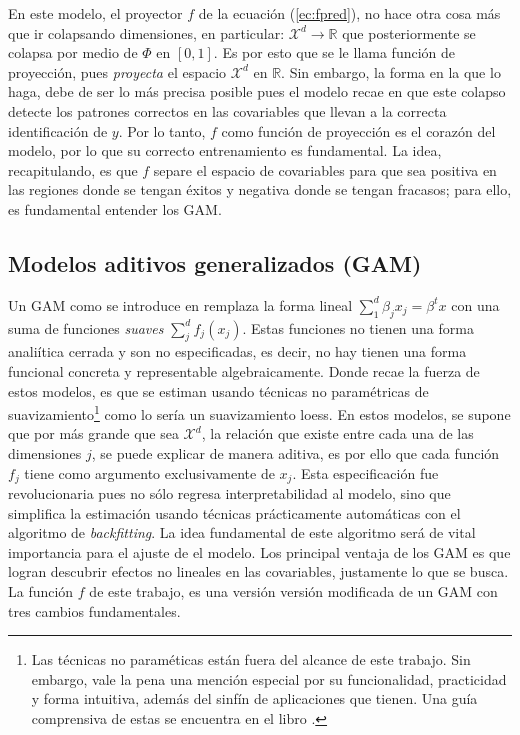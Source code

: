 \documentclass[../Main/Main.tex]{subfiles}
\begin{document}
En este modelo, el proyector $f$ de la ecuación (\ref{ec:fpred}), no hace otra cosa más que ir colapsando dimensiones, en particular: $\mathcal{X}^d \rightarrow \mathbb{R}$ que posteriormente se colapsa por medio de $\Phi$ en $[0,1]$. Es por esto que se le llama función de proyección, pues \textit{proyecta} el espacio $\mathcal{X}^d$ en $\mathbb{R}$. Sin embargo, la forma en la que lo haga, debe de ser lo más precisa posible pues el modelo recae en que este colapso detecte los patrones correctos en las covariables que llevan a la correcta identificación de $y$. Por lo tanto, $f$ como función de proyección es el corazón del modelo, por lo que su correcto entrenamiento es fundamental. La idea, recapitulando, es que $f$ separe el espacio de covariables para que sea positiva en las regiones donde se tengan éxitos y negativa donde se tengan fracasos; para ello, es fundamental entender los GAM.

\subsection{Modelos aditivos generalizados (GAM)} \label{sec:GAM}
Un GAM como se introduce en \citet{hastie1986generalized} remplaza la forma lineal $\sum_{1}^d\beta_jx_j = \beta^tx$ con una suma de funciones \textit{suaves} $\sum_j^d f_j(x_j)$. Estas funciones no tienen una forma analiítica cerrada y son no especificadas, es decir, no hay tienen una forma funcional concreta y representable algebraicamente. Donde recae la fuerza de estos modelos, es que se estiman usando técnicas no paramétricas de suavizamiento\footnote{Las técnicas no paraméticas están fuera del alcance de este trabajo. Sin embargo, vale la pena una mención especial por su funcionalidad, practicidad y forma intuitiva, además del sinfín de aplicaciones que tienen. Una guía comprensiva de estas se encuentra en el libro \citet{wasserman2007all}.} como lo sería un suavizamiento loess. En estos modelos, se supone que por más grande que sea $\mathcal{X}^d$, la relación que existe entre cada una de las dimensiones $j$, se puede explicar de manera aditiva, es por ello que cada función $f_j$ tiene como argumento exclusivamente de $x_j$. Esta especificación fue revolucionaria pues no sólo regresa interpretabilidad al modelo, sino que simplifica la estimación usando técnicas prácticamente automáticas con el algoritmo de \textit{backfitting}. La idea fundamental de este algoritmo será de vital importancia para el ajuste de el modelo. Los principal ventaja de los GAM es que logran descubrir efectos no lineales en las covariables, justamente lo que se busca. La función $f$ de este trabajo, es una versión versión modificada de un GAM con tres cambios fundamentales. 
\end{document}
